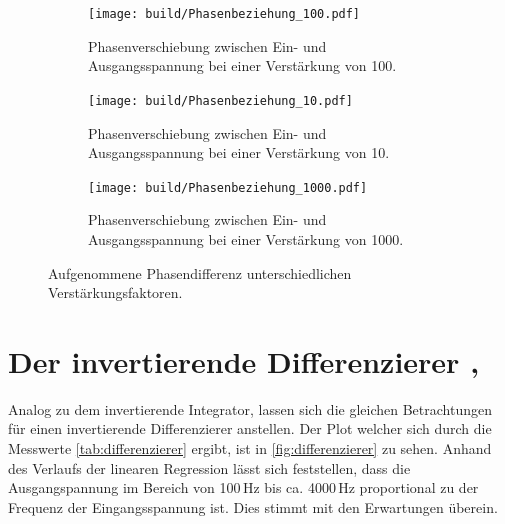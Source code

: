 \begin{figure}
    \centering
    \begin{subfigure}[b]{0.45\textwidth}
        \centering
        \texttt{[image: build/Phasenbeziehung\_100.pdf]}
        \caption{Phasenverschiebung zwischen Ein- und Ausgangsspannung bei einer Verstärkung von 100.}
        \label{fig:phase_100}
    \end{subfigure}
    \hfill
    \begin{subfigure}[b]{0.45\textwidth}
        \centering
        \texttt{[image: build/Phasenbeziehung\_10.pdf]}
        \caption{Phasenverschiebung zwischen Ein- und Ausgangsspannung bei einer Verstärkung von 10.}
        \label{fig:phase_10}
    \end{subfigure} 
    \newline
    \newline   
    \newline   
    \newline   
    \begin{subfigure}[b]{0.45\textwidth}
        \centering
        \texttt{[image: build/Phasenbeziehung\_1000.pdf]}
        \caption{Phasenverschiebung zwischen Ein- und Ausgangsspannung bei einer Verstärkung von 1000.}
        \label{fig:phase_1000}
    \end{subfigure}
       \caption{Aufgenommene Phasendifferenz unterschiedlichen Verstärkungsfaktoren.}
       \label{fig:phase}
\end{figure}
\FloatBarrier

\section{Der invertierende Differenzierer \cite{int_data}, \cite{int_picture}}
Analog zu dem invertierende Integrator, lassen sich die gleichen Betrachtungen 
für einen invertierende Differenzierer anstellen.
Der Plot welcher sich durch die Messwerte \autoref{tab:differenzierer} ergibt, ist in
\autoref{fig:differenzierer} zu sehen.
Anhand des Verlaufs der linearen Regression lässt sich feststellen, dass die Ausgangspannung
im Bereich von 100\,Hz bis ca. 4000\,Hz proportional zu der Frequenz der Eingangsspannung ist.
Dies stimmt mit den Erwartungen überein.

